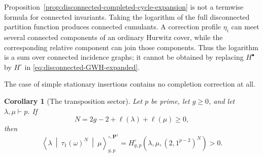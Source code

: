 \documentclass[11pt]{amsart}
\theoremstyle{plain}
\newtheorem{corollary}[theorem]{Corollary}
\theoremstyle{definition}
\numberwithin{equation}{section}
\begin{document}
Proposition~\ref{prop:disconnected-completed-cycle-expansion} is not a
termwise formula for connected invariants.  Taking the logarithm of the
full disconnected partition function produces connected cumulants.  A
correction profile $\eta_i$ can meet several connected components of an
ordinary Hurwitz cover, while the corresponding relative component can
join those components.  Thus the logarithm is a sum over connected
incidence graphs; it cannot be obtained by replacing $H^\bullet$ by
$H^\circ$ in \eqref{eq:disconnected-GWH-expanded}.

The case of simple stationary insertions contains no completion correction
at all.

\begin{corollary}[The transposition sector]
\label{cor:tau-one-positive}
Let $p$ be prime, let $g\geq0$, and let $\lambda,\mu\vdash p$.  If
\[
 N=2g-2+\ell(\lambda)+\ell(\mu)\geq0,
\]
then
\begin{equation}\label{eq:tau-one-Hurwitz}
 \left\langle\lambda\ \middle|\
   \tau_1(\omega)^N\
   \middle|\ \mu\right\rangle^{\circ,\mathbf P^1}_{g,p}
 =H^\circ_{g,p}
 \left(\lambda,\mu,(2,1^{p-2})^N\right)>0.
\end{equation}
\end{corollary}
\end{document}
